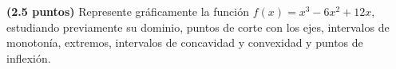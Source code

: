 
\textbf{(2.5 puntos)} Represente gráficamente la función $f(x)=x^3-6x^2+12x$, estudiando previamente su dominio, puntos de corte con los ejes, intervalos de monotonía, extremos, intervalos de concavidad y convexidad y puntos de inflexión.

